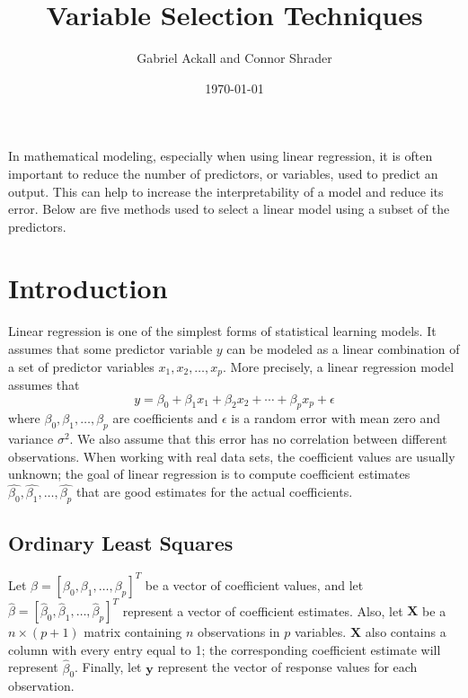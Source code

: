 \documentclass{article}
\title{Variable Selection Techniques}
\author{Gabriel Ackall and Connor Shrader}
\date{\today}
\begin{document}
\maketitle

In mathematical modeling, especially when using linear regression, it is often important to reduce the number of predictors, or variables, used to predict an output. This can help to increase the interpretability of a model and reduce its error. Below are five methods used to select a linear model using a subset of the predictors.

\section{Introduction}
Linear regression is one of the simplest forms of statistical learning models. It assumes that some predictor variable $y$ can be modeled as a linear combination of a set of predictor variables $x_1, x_2, \dotsc, x_p$. More precisely, a linear regression model assumes that
\begin{equation}
	y = \beta_0 + \beta_1 x_1 + \beta_2 x_2 + \cdots + \beta_p x_p + \epsilon
\end{equation}
where $\beta_0, \beta_1, \dotsc, \beta_p$ are coefficients and $\epsilon$ is a random error with mean zero and variance $\sigma^2$. We also assume that this error has no correlation between different observations. When working with real data sets, the coefficient values are usually unknown; the goal of linear regression is to compute coefficient estimates $\hat{\beta_0}, \hat{\beta_1}, \dotsc, \hat{\beta_p}$ that are good estimates for the actual coefficients.

\subsection{Ordinary Least Squares}

Let $\beta = [\beta_0, \beta_1, \dotsc, \beta_p]^{T}$ be a vector of coefficient values, and let $\hat{\beta} = [\hat{\beta}_0, \hat{\beta}_1, \dotsc, \hat{\beta}_p]^{T}$ represent a vector of coefficient estimates. Also, let $\mathbf{X}$ be a $n\times(p + 1)$ matrix containing $n$ observations in $p$ variables. $\mathbf{X}$ also contains a column with every entry equal to 1; the corresponding coefficient estimate will represent $\hat{\beta}_0$. Finally, let $\mathbf{y}$ represent the vector of response values for each observation.
\end{document}
